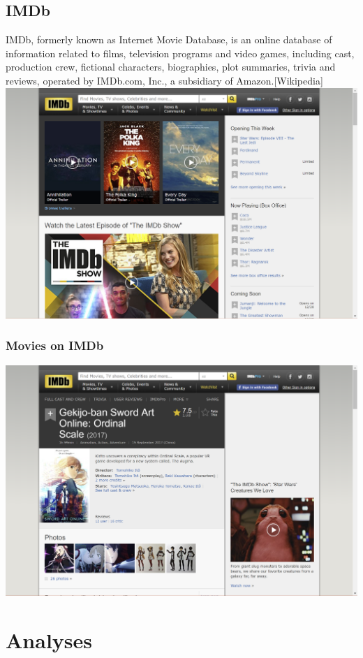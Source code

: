 \documentclass[11pt]{article}
\makeatletter
\def\maxwidth{\ifdim\Gin@nat@width>\linewidth\linewidth
    \else\Gin@nat@width\fi}
\let\Oldincludegraphics\includegraphics
\renewcommand{\includegraphics}[1]{\Oldincludegraphics[width=.8\maxwidth]{#1}}
\makeatother
\begin{document}
  \subsection{IMDb}
  IMDb, formerly known as Internet Movie Database, is an online database
  of information related to films, television programs and video games,
  including cast, production crew, fictional characters, biographies,
  plot summaries, trivia and reviews, operated by IMDb.com, Inc., a
  subsidiary of Amazon.{[}Wikipedia{]}
  \includegraphics{imdb-mainpage.png}
  \subsubsection{Movies on IMDb}
  \includegraphics{imdb-movie.png}


    \section{Analyses}\label{analyses}
\end{document}

